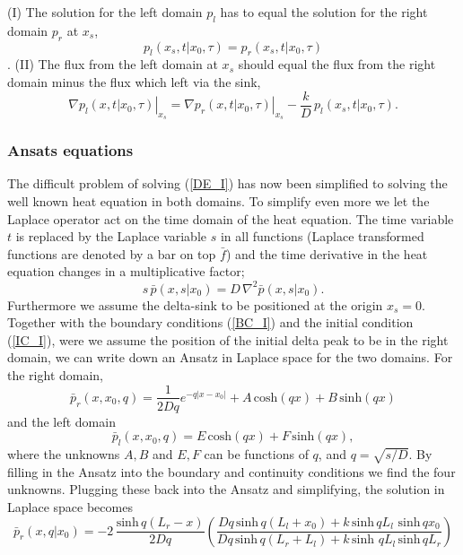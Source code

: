 (I) The solution for the left domain $p_l$ has to equal the solution for the right domain $p_r$ at $x_s$,
\begin{equation} 
 p_l(x_s,t|x_0,\tau) = p_r(x_s,t|x_0,\tau) 
\end{equation}.
(II) The flux from the left domain at $x_s$ should equal the flux from the right domain minus the flux which left via the sink,
\begin{equation} 
 \left. \nabla p_l(x,t|x_0,\tau) \right|_{x_s} = \left. \nabla p_r(x,t|x_0,\tau) \right|_{x_s} - \frac{k}{D} \, p_{l}(x_s,t|x_0,\tau).
\end{equation}

\subsubsection{Ansats equations}

The difficult problem of solving (\ref{DE_I}) has now been simplified to solving the well known heat equation in both domains. To simplify even more we let the Laplace operator act on the time domain of the heat equation. The time variable $t$ is replaced by the Laplace variable $s$ in all functions (Laplace transformed functions are denoted by a bar on top $\bar{f}$) and the time derivative in the heat equation changes in a multiplicative factor;
\begin{equation}
 s \, \bar{p}(x,s|x_0) = D \, \nabla^2 \bar{p}(x,s|x_0).
\end{equation}
Furthermore we assume the delta-sink to be positioned at the origin $x_s=0$. Together with the boundary conditions (\ref{BC_I}) and the initial condition (\ref{IC_I}), were we assume the position of the initial delta peak to be in the right domain, we can write down an Ansatz in Laplace space for the two domains.
For the right domain,
\begin{equation}
 \bar{p}_r(x,x_0,q) = \frac{1}{2 D q} e^{-q |x-x_0|} + A \, \mathrm{cosh} (q x) + B \, \mathrm{sinh} (q x)
 \label{Anz_R}
\end{equation}
and the left domain
\begin{equation}
 \bar{p}_l(x,x_0,q) = E \, \mathrm{cosh} (q x) + F \, \mathrm{sinh} (q x),
\label{Anz_L}
\end{equation}
where the unknowns $A,B$ and $E,F$ can be functions of $q$, and $q=\sqrt{s/D}$. By filling in the Ansatz into the boundary and continuity conditions we find the four unknowns. Plugging these back into the Ansatz and simplifying, the solution in Laplace space becomes
\begin{equation}
 \bar{p}_r(x,q|x_0) = -2 \, \frac{\mathrm{sinh} \, q(L_r - x)}{2 D q} \left( \frac{Dq \, \mathrm{sinh} \, q(L_l + x_0) + k \, \mathrm{sinh} \, q L_l \,\, \mathrm{sinh} \, q x_0}{Dq \, \mathrm{sinh} \, q(L_r + L_l) + k \, \mathrm{sinh} \,\, q L_l \, \mathrm{sinh} \, q L_r} \right)
 \label{SOL_R}
\end{equation}

